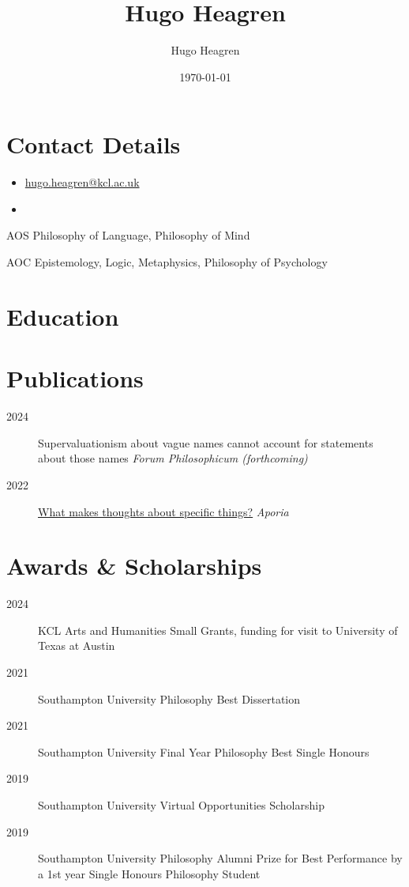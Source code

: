 \documentclass{cv}
\author{Hugo Heagren}
\date{\today}
\title{Hugo Heagren}
\begin{document}
\maketitle
\nocite{*}

\section*{Contact Details}
\begin{itemize}
\item \href{mailto:hugo.heagren@kcl.ac.uk}{hugo.heagren@kcl.ac.uk}
\item {}
\end{itemize}

\begin{areas}
\item[{AOS}] Philosophy of Language, Philosophy of Mind
\item[{AOC}] Epistemology, Logic, Metaphysics, Philosophy of
  Psychology
\end{areas}

\section*{Education}
\printbibliography[check=Education]{}

\section*{Publications}
\begin{description}
\item[{2024}] Supervaluationism about vague names cannot account for statements about those names \textit{Forum Philosophicum (forthcoming)}
\item[{2022}] \href{https://ojs.st-andrews.ac.uk/index.php/aporia/article/view/2451}{What makes thoughts about specific things?} \emph{Aporia}
\end{description}

\section*{Awards \& Scholarships}
\begin{description}
\item[{2024}] KCL Arts and Humanities Small Grants, funding for visit to
University of Texas at Austin
\item[{2021}] Southampton University Philosophy Best Dissertation
\item[{2021}] Southampton University Final Year Philosophy Best Single
Honours
\item[{2019}] Southampton University Virtual Opportunities Scholarship
\item[{2019}] Southampton University Philosophy Alumni Prize for Best
Performance by a 1st year Single Honours Philosophy Student
\end{description}
\end{document}
